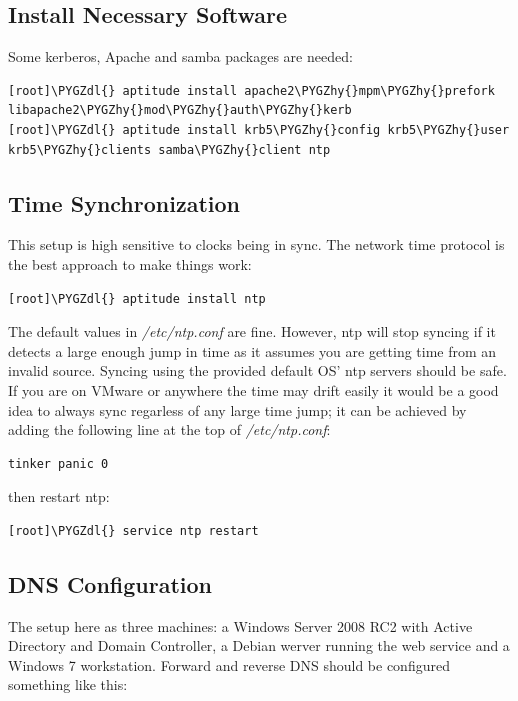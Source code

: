 \documentclass[letterpaper,10pt,english]{sphinxmanual}
\def\PYGZdl{\char`\$}
\def\PYGZhy{\char`\-}
\begin{document}
\subsection{Install Necessary Software}
\label{administrator-guide:install-necessary-software}
Some kerberos, Apache and samba packages are needed:

\begin{Verbatim}[commandchars=\\\{\}]
[root]\PYGZdl{} aptitude install apache2\PYGZhy{}mpm\PYGZhy{}prefork libapache2\PYGZhy{}mod\PYGZhy{}auth\PYGZhy{}kerb
[root]\PYGZdl{} aptitude install krb5\PYGZhy{}config krb5\PYGZhy{}user krb5\PYGZhy{}clients samba\PYGZhy{}client ntp
\end{Verbatim}


\subsection{Time Synchronization}
\label{administrator-guide:time-synchronization}
This setup is high sensitive to clocks being in sync. The network time
protocol is the best approach to make things work:

\begin{Verbatim}[commandchars=\\\{\}]
[root]\PYGZdl{} aptitude install ntp
\end{Verbatim}

The default values in \emph{/etc/ntp.conf} are fine. However, ntp will stop
syncing if it detects a large enough jump in time as it assumes you
are getting time from an invalid source.  Syncing using the provided
default OS' ntp servers should be safe. If you are on VMware or
anywhere the time may drift easily it would be a good idea to always
sync regarless of any large time jump; it can be achieved by adding
the following line at the top of \emph{/etc/ntp.conf}:

\begin{Verbatim}[commandchars=\\\{\}]
tinker panic 0
\end{Verbatim}

then restart ntp:

\begin{Verbatim}[commandchars=\\\{\}]
[root]\PYGZdl{} service ntp restart
\end{Verbatim}


\subsection{DNS Configuration}
\label{administrator-guide:dns-configuration}
The setup here as three machines: a Windows Server 2008 RC2 with
Active Directory and Domain Controller, a Debian werver running the
web service and a Windows 7 workstation. Forward and reverse DNS
should be configured something like this:
\end{document}
